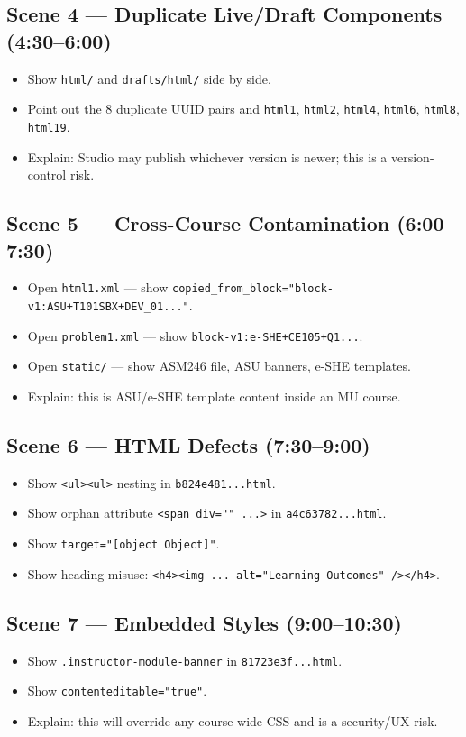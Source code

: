\subsection*{Scene 4 — Duplicate Live/Draft Components (4:30--6:00)}
\begin{itemize}
  \item Show \texttt{html/} and \texttt{drafts/html/} side by side.
  \item Point out the 8 duplicate UUID pairs and \texttt{html1}, \texttt{html2}, \texttt{html4}, \texttt{html6}, \texttt{html8}, \texttt{html19}.
  \item Explain: Studio may publish whichever version is newer; this is a version-control risk.
\end{itemize}

\subsection*{Scene 5 — Cross-Course Contamination (6:00--7:30)}
\begin{itemize}
  \item Open \texttt{html1.xml} — show \texttt{copied\_from\_block="block-v1:ASU+T101SBX+DEV\_01..."}.
  \item Open \texttt{problem1.xml} — show \texttt{block-v1:e-SHE+CE105+Q1...}.
  \item Open \texttt{static/} — show ASM246 file, ASU banners, e-SHE templates.
  \item Explain: this is ASU/e-SHE template content inside an MU course.
\end{itemize}

\subsection*{Scene 6 — HTML Defects (7:30--9:00)}
\begin{itemize}
  \item Show \texttt{<ul><ul>} nesting in \texttt{b824e481...html}.
  \item Show orphan attribute \texttt{<span div="" ...>} in \texttt{a4c63782...html}.
  \item Show \texttt{target="[object Object]"}.
  \item Show heading misuse: \texttt{<h4><img ... alt="Learning Outcomes" /></h4>}.
\end{itemize}

\subsection*{Scene 7 — Embedded Styles (9:00--10:30)}
\begin{itemize}
  \item Show \texttt{.instructor-module-banner} in \texttt{81723e3f...html}.
  \item Show \texttt{contenteditable="true"}.
  \item Explain: this will override any course-wide CSS and is a security/UX risk.
\end{itemize}

